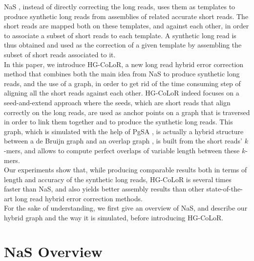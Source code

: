 \documentclass[long, final]{jobim2017}
\begin{document}
\indent NaS \cite{Madoui2015}, instead of directly correcting the long reads, uses them as templates to produce synthetic long reads from assemblies of related accurate short reads. The short reads are mapped both on these templates, and against each other, in order to associate a subset of short reads to each template. A synthetic long read is thus obtained and used as the correction of a given template by assembling the subset of short reads associated to it. \\
\indent In this paper, we introduce HG-CoLoR, a new long read hybrid error correction method that combines both the main idea from NaS to produce synthetic long reads, and the use of a graph, in order to get rid of the time consuming step of aligning all the short reads against each other. HG-CoLoR indeed focuses on a seed-and-extend approach where the seeds, which are short reads that align correctly on the long reads, are used as anchor points on a graph that is traversed in order to link them together and to produce the synthetic long reads. This graph, which is simulated with the help of PgSA \cite{Kowalski2015}, is actually a hybrid structure between a de Bruijn graph and an overlap graph \cite{Ehrenfecht2004}, is built from the short reads' $k$-mers, and allows to compute perfect overlaps of variable length between these $k$-mers. \\
\indent Our experiments show that, while producing comparable results both in terms of length and accuracy of the synthetic long reads, HG-CoLoR is several times faster than NaS, and also yields better assembly results than other state-of-the-art long read hybrid error correction methods. \\
\indent For the sake of understanding, we first give an overview of NaS, and describe our hybrid graph and the way it is simulated, before introducing HG-CoLoR.

\section{NaS Overview}
\label{sec:NaSO}
\end{document}
